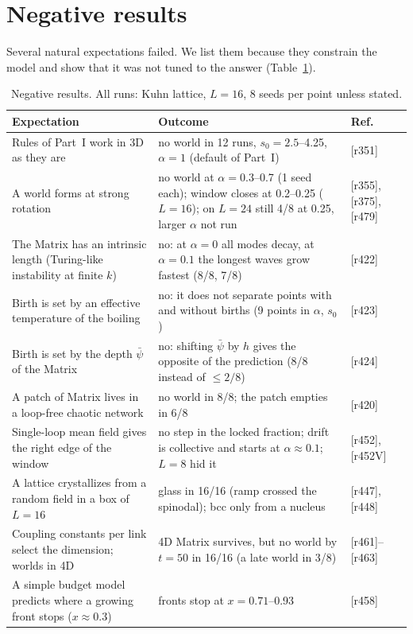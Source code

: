 \documentclass[reprint,pre,amsmath,amssymb,superscriptaddress,nofootinbib]{revtex4-2}
\newcommand{\sz}{s_0}
\begin{document}
\section{Negative results}\label{sec:neg}
Several natural expectations failed. We list them because they constrain the model and show that it was not tuned to the answer (Table~\ref{tab:neg}).

\begin{table}[t]
\caption{Negative results. All runs: Kuhn lattice, $L=16$, 8 seeds per point unless stated.}\label{tab:neg}
\begin{ruledtabular}
\begin{tabular}{p{}p{}l}
Expectation & Outcome & Ref.\\
\hline
Rules of Part~I work in 3D as they are & no world in 12 runs, $\sz=2.5$--4.25, $\alpha=1$ (default of Part~I) & [r351]\\
A world forms at strong rotation & no world at $\alpha=0.3$--0.7 (1 seed each); window closes at 0.2--0.25 ($L=16$); on $L=24$ still 4/8 at 0.25, larger $\alpha$ not run & [r355], [r375], [r479]\\
The Matrix has an intrinsic length (Turing-like instability at finite $k$) & no: at $\alpha=0$ all modes decay, at $\alpha=0.1$ the longest waves grow fastest (8/8, 7/8) & [r422]\\
Birth is set by an effective temperature of the boiling & no: it does not separate points with and without births (9 points in $\alpha$, $\sz$) & [r423]\\
Birth is set by the depth $\bar\psi$ of the Matrix & no: shifting $\bar\psi$ by $h$ gives the opposite of the prediction (8/8 instead of $\le2/8$) & [r424]\\
A patch of Matrix lives in a loop-free chaotic network & no world in 8/8; the patch empties in 6/8 & [r420]\\
Single-loop mean field gives the right edge of the window & no step in the locked fraction; drift is collective and starts at $\alpha\approx0.1$; $L=8$ hid it & [r452], [r452V]\\
A lattice crystallizes from a random field in a box of $L=16$ & glass in 16/16 (ramp crossed the spinodal); bcc only from a nucleus & [r447], [r448]\\
Coupling constants per link select the dimension; worlds in 4D & 4D Matrix survives, but no world by $t=50$ in 16/16 (a late world in 3/8) & [r461]--[r463]\\
A simple budget model predicts where a growing front stops ($x\approx0.3$) & fronts stop at $x=0.71$--0.93 & [r458]\\
\end{tabular}
\end{ruledtabular}
\end{table}
\end{document}
